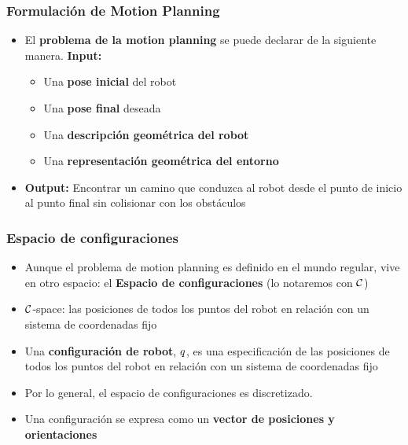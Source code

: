 %    
%
%    

\begin{frame}
    \frametitle{Formulación de Motion Planning}
    
    \begin{itemize}
        \item El {\bf problema de la motion planning} se puede declarar de la siguiente manera. \textbf{Input:}
        \begin{itemize}
            \item Una \textbf{pose inicial} del robot
            \item Una \textbf{pose final} deseada
            \item Una \textbf{descripción geométrica del robot}
            \item Una \textbf{representación geométrica del entorno}
        \end{itemize}
        \item \textbf{Output:} Encontrar un camino que conduzca al robot desde el punto de inicio al punto final sin colisionar con los obstáculos
    \end{itemize}
\end{frame}

\begin{frame}
    \frametitle{Espacio de configuraciones}
    
    \begin{itemize}
        \item Aunque el problema de motion planning es definido en el mundo regular, vive en otro espacio: el {\bf Espacio de configuraciones} (lo notaremos con $\mathcal{C}$)
        \item $\mathcal{C}$-space: las posiciones de todos los puntos del robot en relación con un sistema de coordenadas fijo
        \item Una {\bf configuración de robot}, $q$, es una especificación de las posiciones de todos los puntos del robot en relación con un sistema de coordenadas fijo
        \item Por lo general, el espacio de configuraciones es discretizado.
        \item Una configuración se expresa como un {\bf vector de posiciones y orientaciones}
    \end{itemize}
    
\end{frame}

